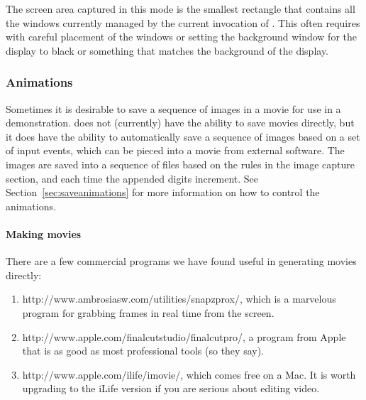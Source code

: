 The screen area captured in this mode is the smallest rectangle that
contains all the windows currently managed by the current invocation of
\map{}.  This often requires with careful placement of the windows or
setting the background window for the display to black or something that
matches the background of the \map{} display.


\subsubsection{Animations}
\label{sec:animation}

Sometimes it is desirable to save a sequence of images in a movie for use
in a demonstration.  \map{} does not (currently) have the ability to save
movies directly, but it does have the ability to automatically save a
sequence of images based on a set of input events, which can be pieced into
a movie from external software.  The images
are saved into a sequence of files based on the rules in the image capture
section, and each time the appended digits increment.  See
Section~\ref{sec:saveanimations} for more information on how to control the
animations.

\paragraph{Making movies}

There are a few commercial programs we have found useful in 
generating movies directly:
\begin{enumerate}
  \item {}
    {http://www.ambrosiasw.com/utilities/snapzprox/}, which is a marvelous
    program for grabbing frames in real time from the screen.
  \item {}
    {http://www.apple.com/finalcutstudio/finalcutpro/}, a program from
    Apple that is as good as most professional tools (so they say).
  \item {} {http://www.apple.com/ilife/imovie/},
    which comes free on a Mac.  It is worth upgrading to the iLife version
    if you are serious about editing video.
\end{enumerate}

